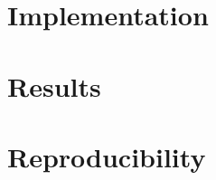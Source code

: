 \documentclass[11pt]{article}
\begin{document}
    \section{Implementation}

    \section{Results}
    
    
    \section{Reproducibility}
  
\end{document}
